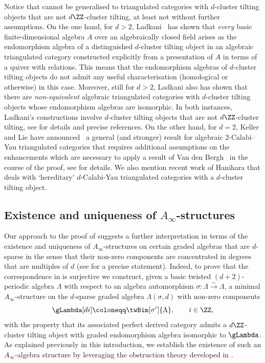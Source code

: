 \documentclass[a4paper]{amsart}
\begin{document}
Notice that  cannot be generalised to
triangulated categories with $d$-cluster tilting objects that are not
$d\ZZ$-cluster tilting, at least not without further assumptions. On the one
hand, for $d>2$, Ladkani~\cite{Lad16} has shown that \emph{every} basic
finite-dimensional algebra $A$ over an algebraically closed field arises as the
endomorphism algebra of a distinguished $d$-cluster tilting object in an
algebraic triangulated category constructed explicitly from a presentation of
$A$ in terms of a quiver with relations. This means that the endomorphism
algebras of $d$-cluster tilting objects do not admit any useful characterisation
(homological or otherwise) in this case. Moreover, still for $d>2$, Ladkani also
has shown that there are \emph{non-equivalent} algebraic triangulated categories
with $d$-cluster tilting objects whose endomorphism algebras are isomorphic. In
both instances, Ladkani's constructions involve $d$-cluster tilting objects that
are not $d\ZZ$-cluster tilting, see  for details and precise
references. On the other hand, for $d=2$, Keller and Lie have announced~\cite{KL23a} a
general (and stronger) result for algebraic $2$-Calabi--Yau triangulated
categories that requires additional assumptions on the enhancements which are
necessary to apply a result of Van den Bergh~\cite{VdBer15} in the course of the
proof, see  for details. We also mention recent
work of Hanihara \cite{Han22} that deals with `hereditary' $d$-Calabi-Yau
triangulated categories with a $d$-cluster tilting object.

\subsection*{Existence and uniqueness of $A_\infty$-structures}

Our approach to the proof of  suggests a
further interpretation in terms of the existence and uniqueness of
$A_\infty$-structures on certain graded algebras that are $d$-sparse in the
sense that their non-zero components are concentrated in degrees that are
multiples of $d$ (see  for a precise statement).
Indeed, to prove that the correspondence in
 is surjective we construct, given a basic
twisted $(d+2)$-periodic algebra $\Lambda$ with respect to an algebra
automorphism $\sigma\colon\Lambda\stackrel{\sim}{\to}\Lambda$, a minimal
$A_\infty$-structure on the $d$-sparse graded algebra $\Lambda(\sigma,d)$ with
non-zero components
\[
  \gLambda[di]\coloneqq\twBim[\sigma^i]{\Lambda},\qquad i\in\ZZ,
\]
with the property that its associated perfect derived category admits a
$d\ZZ$-cluster tilting object with graded endomorphism algebra isomorphic to
$\gLambda$. As explained previously in this introduction, we establish the
existence of such an $A_\infty$-algebra structure by leveraging the obstruction
theory developed in \cite{Mur20b}.
\end{document}
